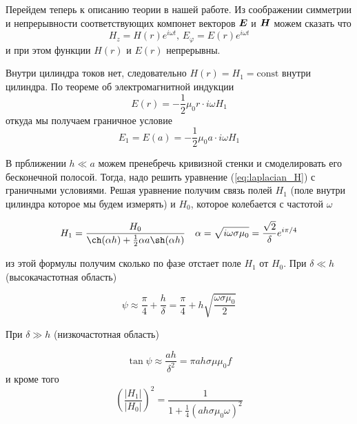 \documentclass[12pt, a4paper]{article}
\begin{document}
Перейдем теперь к описанию теории в нашей работе. Из соображении симметрии и
непрерывности соответствующих компонет векторов $\vb*{E}$ и $\vb*{H}$ можем сказать что
\begin{equation*}
  H_z = H(r)e^{i\omega t} \text{, } E_\varphi = E(r)e^{i\omega t}
\end{equation*}
и при этом функции $H(r)$ и $E(r)$ непрерывны.

Внутри цилиндра токов нет, следовательно $H(r)=H_1=\text{const}$ внутри цилиндра.
По теореме об электромагнитной индукции
\begin{equation*}
  E(r) = -\frac{1}{2}\mu_0 r \cdot i \omega H_1
\end{equation*}
откуда мы получаем граничное условие
\begin{equation}
  E_1=E(a)= -\frac{1}{2}\mu_0 a \cdot i \omega H_1
  \label{eq:granichnoe_uslovie_E}
\end{equation}

В прближении $h \ll a$ можем пренебречь кривизной стенки и смоделировать
его бесконечной полосой. Тогда, надо решить уравнение (\ref{eq:laplacian_H})
с граничными условиями. Решая уравнение получим связь полей $H_1$
(поле внутри цилиндра которое мы будем измерять) и $H_0$, которое колебается с частотой
$\omega$

\begin{equation}
  H_1 = \frac{H_0}{\ch(\alpha h) + \frac{1}{2} \alpha a \sh(\alpha h)}
  \text{\ \ \ }
  \alpha = \sqrt{i\omega \sigma \mu_0} = \frac{\sqrt{2}}{\delta}e^{i\pi/4}
  \label{eq:svyaz_poley}
\end{equation}

из этой формулы получим сколько по фазе отстает поле $H_1$ от $H_0$. При $\delta \ll h$
(высокачастотная область)

\begin{equation}
  \psi \approx \frac{\pi}{4} + \frac{h}{\delta} =
  \frac{\pi}{4} + h \sqrt{\frac{\omega \sigma \mu_0}{2}}
  \label{eq:faza_high_freq}
\end{equation}

При $\delta \gg h$ (низкочастотная область)

\begin{equation}
  \tan \psi \approx \frac{ah}{\delta^2} = \pi a h \sigma \mu \mu_0 f
  \label{eq:phase_low_freq}
\end{equation}
и кроме того
\begin{equation}
  \left(\frac{|H_1|}{|H_0|}\right)^2 = \dfrac{1}{1 + \frac{1}{4}(ah\sigma \mu_0 \omega)^2}
  \label{eq:low_freq_ampl}
\end{equation}
\end{document}
